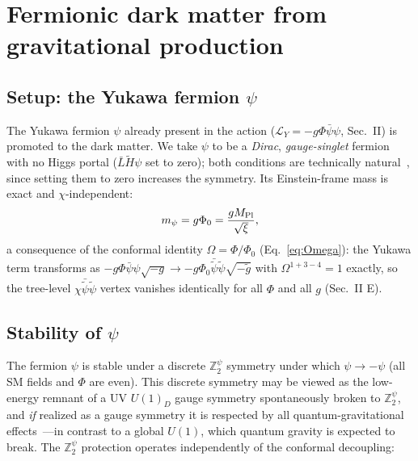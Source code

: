 \documentclass[pdflatex,sn-mathphys-num]{sn-jnl}
\newcommand{\MP}{M_{\rm Pl}}
\newcommand{\Ztwo}{\mathbb{Z}_2}
\newcommand{\Ztwopsi}{\Ztwo^{\psi}}
\newcommand{\PhiV}{\Phi_0}
\theoremstyle{thmstyleone}
\begin{document}
\section{Fermionic dark matter from gravitational production}

\subsection{Setup: the Yukawa fermion $\psi$}

The Yukawa fermion $\psi$ already present in the action ($\mathcal{L}_Y=-g\Phi\bar\psi\psi$, Sec.~II) is promoted to the dark matter. We take $\psi$ to be a \emph{Dirac}, \emph{gauge-singlet} fermion with no Higgs portal ($\bar L\tilde H\psi$ set to zero); both conditions are technically natural~\cite{tHooft1980}, since setting them to zero increases the symmetry. Its Einstein-frame mass is exact and $\chi$-independent:
\begin{equation}
m_\psi=g\PhiV=\frac{g\MP}{\sqrt{\xi}},
\label{eq:mpsi}
\end{equation}
a consequence of the conformal identity $\Omega=\Phi/\PhiV$ (Eq.~\eqref{eq:Omega}): the Yukawa term transforms as $-g\Phi\bar\psi\psi\sqrt{-g}\to-g\PhiV\bar{\tilde\psi}\tilde\psi\sqrt{-\tilde g}$ with $\Omega^{1+3-4}=1$ exactly, so the tree-level $\chi\bar{\tilde\psi}\tilde\psi$ vertex vanishes identically for all $\Phi$ and all $g$ (Sec.~II E).

\subsection{Stability of $\psi$}

The fermion $\psi$ is stable under a discrete $\Ztwopsi$ symmetry under which $\psi\to-\psi$ (all SM fields and $\Phi$ are even). This discrete symmetry may be viewed as the low-energy remnant of a UV $U(1)_D$ gauge symmetry spontaneously broken to $\Ztwopsi$, and \emph{if} realized as a gauge symmetry it is respected by all quantum-gravitational effects~\cite{KraussWilczek1989,BanksSeiberg2011}---in contrast to a global $U(1)$, which quantum gravity is expected to break. The $\Ztwopsi$ protection operates independently of the conformal decoupling:
\end{document}

